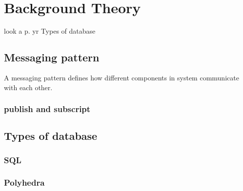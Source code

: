 \section{Background Theory}

look a p. yr
Types of database

\subsection{Messaging pattern}
A messaging pattern defines how different components in system communicate with each other. 
	\subsubsection{publish and subscript}


\subsection{Types of database}

  \subsubsection{SQL}

  \subsubsection{Polyhedra}